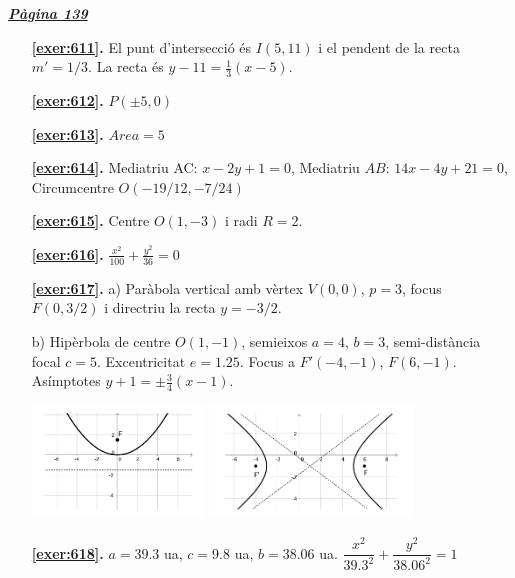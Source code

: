 \hyperlink{page.139}{\textbf{\em Pàgina 139}}
\begin{enumerate}
\item[\fontfamily{phv}\selectfont\color{blue}\textbf{\ref{exer:611}. }] \label{ans:611} 
El punt d'intersecció és $I(5,11)$ i el pendent de la recta $m'=1/3$. La recta és $y-11=\frac {1}{3}(x-5)$.
 \end{enumerate}
\begin{enumerate}
\item[\fontfamily{phv}\selectfont\color{blue}\textbf{\ref{exer:612}. }] \label{ans:612} 
$P(\pm 5, 0)$
\item[\fontfamily{phv}\selectfont\color{blue}\textbf{\ref{exer:613}. }] \label{ans:613} 
$Area=5$
\item[\fontfamily{phv}\selectfont\color{blue}\textbf{\ref{exer:614}. }] \label{ans:614} 
Mediatriu AC: $x-2y+1=0$, Mediatriu $AB$: $14x-4y+21=0$, Circumcentre $O(-19/12, -7/24)$
\item[\fontfamily{phv}\selectfont\color{blue}\textbf{\ref{exer:615}. }] \label{ans:615} 
Centre $O(1,-3)$ i radi $R=2$.
\item[\fontfamily{phv}\selectfont\color{blue}\textbf{\ref{exer:616}. }] \label{ans:616} 
$\frac {x^2}{100}+\frac {y^2}{36}=0$
\item[\fontfamily{phv}\selectfont\color{blue}\textbf{\ref{exer:617}. }] \label{ans:617} 
 a) Paràbola vertical amb vèrtex $V(0,0)$, $p=3$, focus $F(0,3/2)$ i directriu la recta $y=-3/2$. \par b) Hipèrbola de centre $O(1,-1)$, semieixos $a=4$, $b=3$, semi-distància focal $c=5$. Excentricitat $e=1.25$. Focus a $F'(-4,-1)$, $F(6,-1)$. Asímptotes $y+1=\pm \frac {3}{4}(x-1)$. \par \begin {center} \includegraphics [height=3cm]{img-10-bloc3/bloc3-sol-14a} \includegraphics [height=3cm]{img-10-bloc3/bloc3-sol-14b} \end {center} 
\item[\fontfamily{phv}\selectfont\color{blue}\textbf{\ref{exer:618}. }] \label{ans:618} 
$a=39.3$ ua, $c=9.8$ ua, $b=38.06$ ua. $\dfrac {x^2}{39.3^2}+\dfrac {y^2}{38.06^2}=1$
 \end{enumerate}

